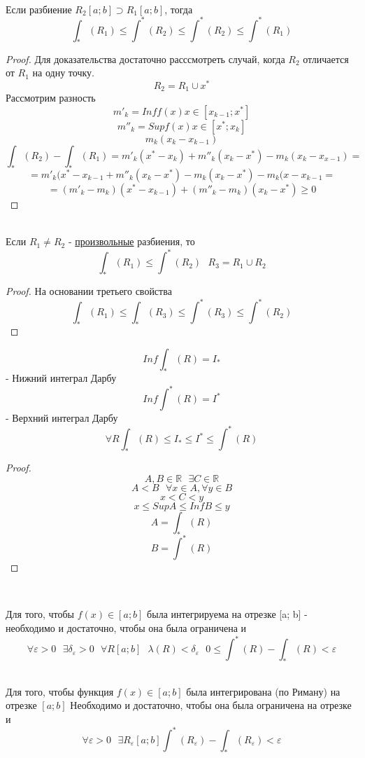 \\
Если разбиение $R_2 [a; b] \supset R_1 [a; b]$, тогда
\[\int_* (R_1) \le \int^* (R_2) \le \int^* (R_2) \le \int^* (R_1)\]

\begin{proof}
  Для доказательства достаточно расссмотреть случай, когда $R_2$ отличается от
  $R_1$ на одну точку.
  \[R_2 = R_1 \cup {x^*}\]
  Рассмотрим разность
  \[m'_k = Inf f(x) x \in [x_{k - 1}; x^*]\]
  \[m''_k = Sup f(x) x \in [x^*; x_k]\]
  \[m_k (x_k - x_{k - 1})\]
  \[\int_* (R_2) - \int_* (R_1) = m'_k (x^* - x_k) + m''_k (x_k - x^*) -
    m_k (x_k - x_{x - 1}) = \]
  \[= m'_k (x^* - x_{k - 1} + m''_k (x_k - x^*) - m_k (x_k - x^*) -
    m_k (x - x_{k - 1} =\]
  \[= (m'_k - m_k)(x^* - x_{k - 1}) + (m''_k - m_k)
    (x_k - x^*) \ge 0\]
\end{proof}

\\
Если $R_1 \ne R_2$ - \underline{произвольные} разбиения, то
\[\int_* (R_1) \le \int^* (R_2) ~~~ R_3 = R_1 \cup R_2\]

\begin{proof}
  На основании третьего свойства
  \[\int_* (R_1) \le \int_* (R_3) \le \int^* (R_3) \le \int^* (R_2)\]
\end{proof}

\[Inf \int_* (R) = I_*\] - Нижний интеграл Дарбу
\[Inf \int^* (R) = I^*\] - Верхний интеграл Дарбу
\[\forall R \int_* (R) \le I_* \le I^* \le \int^* (R)\]

\begin{proof}
  \[A, B \in \mathbb R ~~~ \exists C \in \mathbb R\]
  \[A < B ~~~ \forall x \in A, \forall y \in B\]
  \[x < C < y\]
  \[x \le Sup A \le Inf B \le y\]
  \[A = {\int_* (R)}\]
  \[B = {\int^* (R)}\]
\end{proof}

\\

\begin{theorem}
  Для того, чтобы $f(x) \in [a; b]$ была интегрируема на отрезке [a; b] -
  необходимо и достаточно, чтобы она была ограничена и
  \[\forall \varepsilon > 0 ~~~ \exists \delta_\varepsilon > 0 ~~~\forall R [a; b]
    ~~~ \lambda (R) < \delta_\varepsilon ~~~ 0 \le \int^* (R) - \int_* (R) <
    \varepsilon\]

  \\
  Для того, чтобы функция $f(x) \in [a; b]$ была интегрирована (по Риману)
  на отрезке $[a; b]$ Необходимо и достаточно, чтобы она была ограничена на
  отрезке и
  \[\forall \varepsilon > 0 ~~~ \exists R_\varepsilon [a; b] \int^*
    (R_\varepsilon) - \int_* (R_\varepsilon) < \varepsilon\]
\end{theorem}

